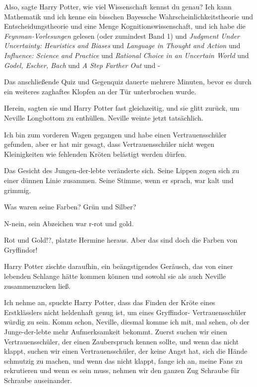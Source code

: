\glqq Also\grqq{}, sagte Harry Potter, \glqq wie viel Wissenschaft kennst du
genau? Ich kann Mathematik und ich kenne ein bisschen Bayessche
Wahrscheinlichkeitstheorie und Entscheidungstheorie und eine Menge
Kognitionswissenschaft, und ich habe die \emph{Feynman-Vorlesungen} gelesen
(oder zumindest Band 1) und \emph{Judgment Under Uncertainty: Heuristics and
Biases} und \emph{Language in Thought and Action} und \emph{Influence: Science
and Practice} und \emph{Rational Choice in an Uncertain World} und \emph{Godel,
Escher, Bach} und \emph{A Step Farther Out} und -\grqq{}

Das anschließende Quiz und Gegenquiz dauerte mehrere Minuten, bevor es durch ein
weiteres zaghaftes Klopfen an der Tür unterbrochen wurde.

\glqq Herein\grqq{}, sagten sie und Harry Potter fast gleichzeitig, und sie
glitt zurück, um Neville Longbottom zu enthüllen. Neville weinte jetzt
tatsächlich.

\glqq Ich bin zum vorderen Wagen gegangen und habe einen Vertrauensschüler
gefunden, aber er hat mir gesagt, dass Vertrauensschüler nicht wegen
Kleinigkeiten wie fehlenden Kröten belästigt werden dürfen.\grqq{}

Das Gesicht des Jungen-der-lebte veränderte sich. Seine Lippen zogen sich zu
einer dünnen Linie zusammen. Seine Stimme, wenn er sprach, war kalt und grimmig.

\glqq Was waren seine Farben? Grün und Silber?\grqq{}

\glqq N-nein, sein Abzeichen war r-rot und gold.\grqq{}

\glqq Rot und Gold!?\grqq{}, platzte Hermine heraus. \glqq Aber das sind doch
die Farben von Gryffindor!\grqq{}

Harry Potter zischte daraufhin, ein beängstigendes Geräusch, das von einer
lebenden Schlange hätte kommen können und sowohl sie als auch Neville
zusammenzucken ließ.

\glqq Ich nehme an\grqq{}, spuckte Harry Potter, \glqq dass das Finden der Kröte
eines Erstklässlers nicht heldenhaft genug ist, um eines Gryffindor-
Vertrauensschüler würdig zu sein. Komm schon, Neville, diesmal komme ich mit,
mal sehen, ob der Junge-der-lebte mehr Aufmerksamkeit bekommt. Zuerst suchen wir
einen Vertrauensschüler, der einen Zauberspruch kennen sollte, und wenn das
nicht klappt, suchen wir einen Vertrauensschüler, der keine Angst hat, sich die
Hände schmutzig zu machen, und wenn das nicht klappt, fange ich an, meine Fans
zu rekrutieren und wenn es sein muss, nehmen wir den ganzen Zug Schraube für
Schraube auseinander.\grqq{}

